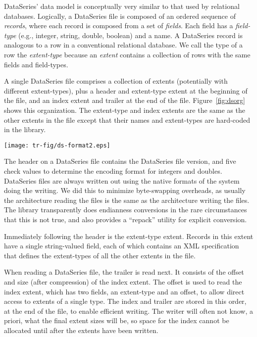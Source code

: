 \documentclass{acm_proc_article-sp}
\begin{document}
DataSeries' data model is conceptually very similar to that used by
relational databases.  Logically, a DataSeries file is composed of an
ordered sequence of {\it records}, where each record is composed from
a set of {\it fields}. Each field has a {\it field-type} (e.g.,
integer, string, double, boolean) and a name. A DataSeries record is
analogous to a row in a conventional relational database. We call the
type of a row the {\it extent-type} because an {\it extent} contains a
collection of rows with the same fields and field-types.

A single DataSeries file comprises a collection of extents
(potentially with different extent-types), plus a header and
extent-type extent at the beginning of the file, and an index extent
and trailer at the end of the file. Figure~\ref{fig:dsorg} shows this
organization.  The extent-type and index extents are the same as the
other extents in the file except that their names and extent-types are
hard-coded in the library.

\begin{figure*}
\hfil\texttt{[image: tr-fig/ds-format2.eps]}\hfil
\caption{Internal structure of a DataSeries file. }
\label{fig:dsorg}
\end{figure*}

The header on a DataSeries file contains the DataSeries file version,
and five check values to determine the encoding format for integers
and doubles.  DataSeries files are always written out using the native
formats of the system doing the writing. We did this to minimize
byte-swapping overheads, as usually the architecture reading the files
is the same as the architecture writing the files.  The library
transparently does endianness conversions in the rare circumstances
that this is not true, and also provides a ``repack'' utility for
explicit conversion.

Immediately following the header is the extent-type extent. Records in
this extent have a single string-valued field, each of which 
contains an XML specification that defines the extent-types of all the 
other extents in the file.  

When reading a DataSeries file, the trailer is read next.  It consists
of the offset and size (after compression) of the index extent.  The
offset is used to read the index extent, which has two fields, an
extent-type and an offset, to allow direct access to extents of a
single type.  The index and trailer are stored in this order, at the
end of the file, to enable efficient writing. The writer will often
not know, a priori, what the final extent sizes will be, so space for
the index cannot be allocated until after the extents have been
written.
\end{document}

